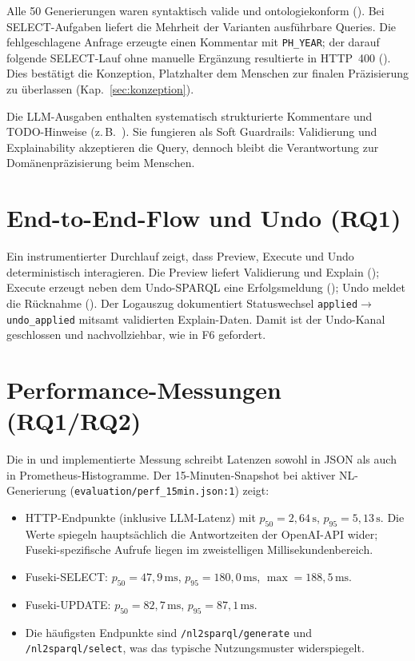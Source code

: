 Alle 50 Generierungen waren syntaktisch valide und ontologiekonform (). Bei SELECT-Aufgaben liefert die Mehrheit der Varianten ausführbare Queries. Die fehlgeschlagene Anfrage erzeugte einen Kommentar mit \texttt{PH\_YEAR}; der darauf folgende SELECT-Lauf ohne manuelle Ergänzung resultierte in HTTP~400 (). Dies bestätigt die Konzeption, Platzhalter dem Menschen zur finalen Präzisierung zu überlassen (Kap.~\ref{sec:konzeption}).

Die LLM-Ausgaben enthalten systematisch strukturierte Kommentare und TODO-Hinweise (z.\,B.\ ). Sie fungieren als Soft Guardrails: Validierung und Explainability akzeptieren die Query, dennoch bleibt die Verantwortung zur Domänenpräzisierung beim Menschen.

\section{End-to-End-Flow und Undo (RQ1)}

Ein instrumentierter Durchlauf zeigt, dass Preview, Execute und Undo deterministisch interagieren. Die Preview liefert Validierung und Explain (); Execute erzeugt neben dem Undo-SPARQL eine Erfolgsmeldung (); Undo meldet die Rücknahme (). Der Logauszug  dokumentiert Statuswechsel \texttt{applied}\(\rightarrow\)\texttt{undo\_applied} mitsamt validierten Explain-Daten. Damit ist der Undo-Kanal geschlossen und nachvollziehbar, wie in F6 gefordert.

\section{Performance-Messungen (RQ1/RQ2)}

Die in  und  implementierte Messung schreibt Latenzen sowohl in JSON als auch in Prometheus-Histogramme. Der 15-Minuten-Snapshot bei aktiver NL-Generierung (\texttt{evaluation/perf\_15min.json:1}) zeigt:

\begin{itemize}
  \item HTTP-Endpunkte (inklusive LLM-Latenz) mit $p_{50} = 2{,}64\,\mathrm{s}$, $p_{95} = 5{,}13\,\mathrm{s}$. Die Werte spiegeln hauptsächlich die Antwortzeiten der OpenAI-API wider; Fuseki-spezifische Aufrufe liegen im zweistelligen Millisekundenbereich.
  \item Fuseki-SELECT: $p_{50} = 47{,}9\,\mathrm{ms}$, $p_{95} = 180{,}0\,\mathrm{ms}$, $ \max = 188{,}5\,\mathrm{ms}$.
  \item Fuseki-UPDATE: $p_{50} = 82{,}7\,\mathrm{ms}$, $p_{95} = 87{,}1\,\mathrm{ms}$.
  \item Die häufigsten Endpunkte sind \texttt{/nl2sparql/generate} und \texttt{/nl2sparql/select}, was das typische Nutzungsmuster widerspiegelt.
\end{itemize}

